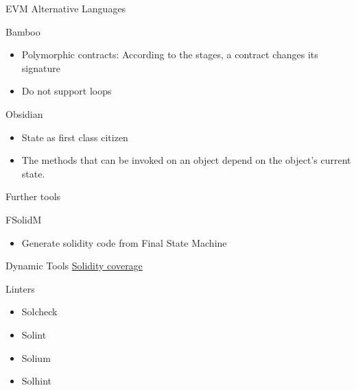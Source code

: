 

\begin{frame}{EVM Alternative Languages}
\begin{block}{Bamboo~\cite{bamboo}}
\begin{itemize}
\item Polymorphic contracts: According to the stages, a contract changes its signature
\item Do not support loops
\end{itemize}
\end{block}

\begin{block}{Obsidian~\cite{obsidian}}
  \begin{itemize}
  \item State as first class citizen
  \item The methods that can be invoked on an object depend on the object’s current state.
  \end{itemize}
\end{block}
\end{frame}


\begin{frame}{Further tools}

\begin{block}{FSolidM~\cite{bib:FSolidM}}
\begin{itemize}
\item Generate solidity code from Final State Machine
\end{itemize}
\end{block}

\begin{block}{Dynamic Tools}
\href{https://github.com/sc-forks/solidity-coverage}{Solidity coverage}
\end{block}

\begin{block}{Linters}
\begin{itemize}
\item Solcheck
\item Solint
\item Solium
\item Solhint
\end{itemize}
\end{block}


\end{frame}
